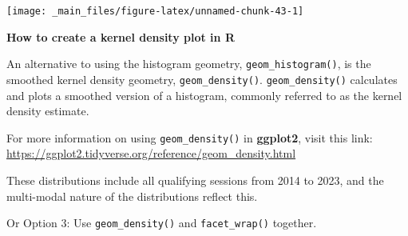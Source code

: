 \documentclass[
]{book}
\begin{document}
\begin{center}\texttt{[image: \_main\_files/figure-latex/unnamed-chunk-43-1]} \end{center}

\begin{blackbox}

\begin{center}
\textbf{How to create a kernel density plot in R}

\end{center}

An alternative to using the histogram geometry, \texttt{geom\_histogram()}, is the smoothed kernel density geometry, \texttt{geom\_density()}. \texttt{geom\_density()} calculates and plots a smoothed version of a histogram, commonly referred to as the kernel density estimate.

For more information on using \texttt{geom\_density()} in \textbf{ggplot2}, visit this link: \url{https://ggplot2.tidyverse.org/reference/geom_density.html}

\end{blackbox}

These distributions include all qualifying sessions from 2014 to 2023, and the multi-modal nature of the distributions reflect this.

Or Option 3: Use \texttt{geom\_density()} and \texttt{facet\_wrap()} together.
\end{document}
